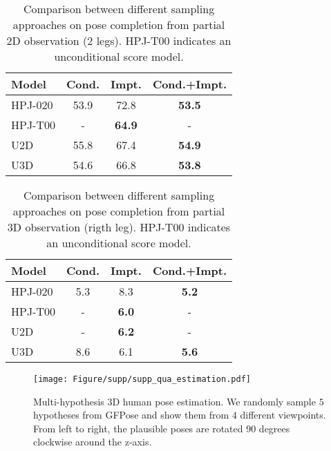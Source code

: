 \documentclass[10pt,twocolumn,letterpaper]{article}
\begin{document}
\begin{table}
    \centering
    \small
\begin{tabular}{l c c c}
            \toprule
            Model & Cond. & Impt. & Cond.+Impt. \\
            \midrule
            HPJ-020 &  53.9 & 72.8 & \textbf{53.5} \\
            HPJ-T00 &  - & \textbf{64.9} & - \\
            U2D &  55.8 & 67.4 & \textbf{54.9} \\
            U3D & 54.6 & 66.8 & \textbf{53.8} \\
            \bottomrule
        \end{tabular}
\caption{Comparison between different sampling approaches on pose completion from partial 2D observation (2 legs). HPJ-T00 indicates an unconditional score model.}
    \label{table:supp_impt_complete_2d}
\end{table}

\begin{table}
    \centering
    \small
\begin{tabular}{l c c c}
            \toprule
            Model & Cond. & Impt. & Cond.+Impt. \\
            \midrule
            HPJ-020 &  5.3 & 8.3 & \textbf{5.2} \\
            HPJ-T00 &  - & \textbf{6.0} & - \\
            U2D &  - & \textbf{6.2} & - \\
            U3D &  8.6 & 6.1 & \textbf{5.6} \\
            \bottomrule
        \end{tabular}
\caption{Comparison between different sampling approaches on pose completion from partial 3D observation (rigth leg). HPJ-T00 indicates an unconditional score model.}
    \label{table:supp_impt_complete_3d}
\end{table}

\begin{figure*}[!t]
    \centering
    \texttt{[image: Figure/supp/supp\_qua\_estimation.pdf]}
\caption{Multi-hypothesis 3D human pose estimation. We randomly sample $5$ hypotheses from GFPose and show them from $4$ different viewpoints. From left to right, the plausible poses are rotated 90 degrees clockwise around the z-axis.}
    \label{fig:supp_qua_estimation}
\end{figure*}
\end{document}
